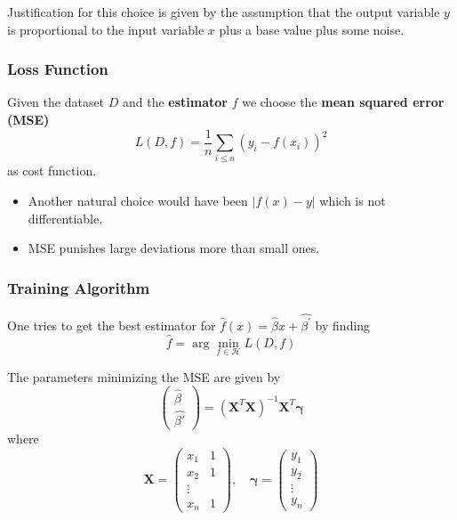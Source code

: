 
Justification for this choice is given by the assumption that the output variable $y$ is proportional to the input variable $x$ plus a base value plus some noise.

\subsubsection{Loss Function}
Given the dataset $D$ and the \textbf{estimator} $f$ we choose the \textbf{mean squared error (MSE)}
\begin{equation*}
    L(D,f)=\frac{1}{n}\sum_{i\leq n}{\left(y_i-f(x_i)\right)}^2
\end{equation*}
as cost function.


\begin{itemize}
    \item Another natural choice would have been $|f(x)-y|$ which is not differentiable.
    \item MSE punishes large deviations more than small ones.
\end{itemize}

\subsubsection{Training Algorithm}
One tries to get the best estimator for $\hat{f}(x)=\hat{\beta}x+\widehat{\beta^{\prime}}$ by finding
\begin{equation*}
    \hat{f}=\arg\min_{f\in\mathcal{H}}L(D,f)
\end{equation*}


The parameters minimizing the MSE are given by
\begin{equation*}
    \begin{pmatrix}
        \hat{\beta} \\
        \widehat{\beta'}
    \end{pmatrix}
    ={(\mathbf{X}^T \mathbf{X})}^{-1}\mathbf{X}^T\mathbf{\gamma}
\end{equation*}
where
\begin{equation*}
    \mathbf{X}=
    \begin{pmatrix}
        x_1 & 1 \\
        x_2 & 1 \\
        \vdots  \\
        x_n & 1
    \end{pmatrix},\quad
    \mathbf{\gamma}=
    \begin{pmatrix}
        y_1    \\
        y_2    \\
        \vdots \\
        y_n
    \end{pmatrix}
\end{equation*}

